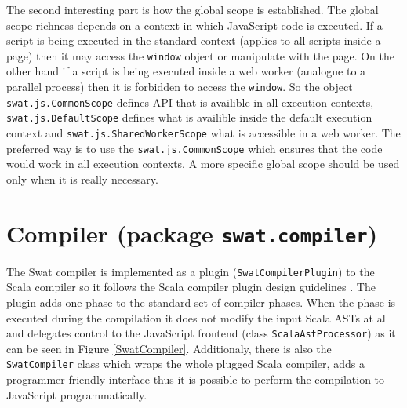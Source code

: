 \documentclass[12pt,a4paper]{report}
\begin{document}
The second interesting part is how the global scope is established. The global scope richness depends on a context in which JavaScript code is executed. If a script is being executed in the standard context (applies to all scripts inside a page) then it may access the \texttt{window} object or manipulate with the page. On the other hand if a script is being executed inside a web worker (analogue to a parallel process) then it is forbidden to access the \texttt{window}. So the object \texttt{swat.js.CommonScope} defines API that is availible in all execution contexts, \texttt{swat.js.DefaultScope} defines what is availible inside the default execution context and \texttt{swat.js.SharedWorkerScope} what is accessible in a web worker. The preferred way is to use the \texttt{swat.js.CommonScope} which ensures that the code would work in all execution contexts. A more specific global scope should be used only when it is really necessary.

\section{Compiler (package \texttt{swat.compiler})}

The Swat compiler is implemented as a plugin (\texttt{SwatCompilerPlugin}) to the Scala compiler so it follows the Scala compiler plugin design guidelines \cite{CompilerPlugins}. The plugin adds one phase to the standard set of compiler phases. When the phase is executed during the compilation it does not modify the input Scala ASTs at all and delegates control to the JavaScript frontend (class \texttt{ScalaAstProcessor}) as it can be seen in Figure \ref{SwatCompiler}. Additionaly, there is also the \texttt{SwatCompiler} class which wraps the whole plugged Scala compiler, adds a programmer-friendly interface thus it is possible to perform the compilation to JavaScript programmatically.
\end{document}
